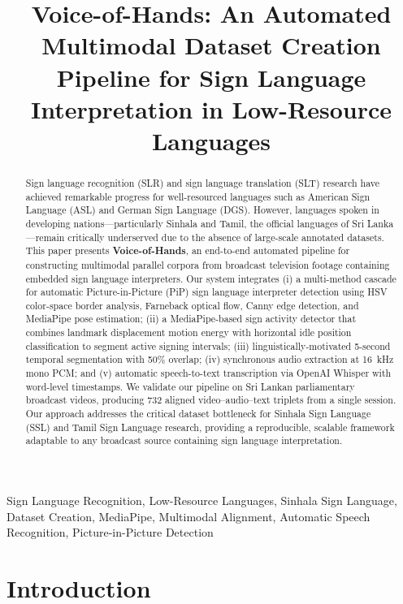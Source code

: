 \documentclass[journal]{IEEEtran}
\title{Voice-of-Hands: An Automated Multimodal Dataset Creation Pipeline for Sign Language Interpretation in Low-Resource Languages}
\author{
    \IEEEauthorblockN{Author Names\IEEEauthorrefmark{1}}
    \IEEEauthorblockA{\IEEEauthorrefmark{1}Department of Computer Science, University Name, Sri Lanka\\
    Email: corresponding.author@university.lk}
}
\begin{document}
\maketitle

\begin{abstract}
Sign language recognition (SLR) and sign language translation (SLT) research have achieved remarkable progress for well-resourced languages such as American Sign Language (ASL) and German Sign Language (DGS). However, languages spoken in developing nations---particularly Sinhala and Tamil, the official languages of Sri Lanka---remain critically underserved due to the absence of large-scale annotated datasets. This paper presents \textbf{Voice-of-Hands}, an end-to-end automated pipeline for constructing multimodal parallel corpora from broadcast television footage containing embedded sign language interpreters. Our system integrates (i) a multi-method cascade for automatic Picture-in-Picture (PiP) sign language interpreter detection using HSV color-space border analysis, Farneback optical flow, Canny edge detection, and MediaPipe pose estimation; (ii) a MediaPipe-based sign activity detector that combines landmark displacement motion energy with horizontal idle position classification to segment active signing intervals; (iii) linguistically-motivated 5-second temporal segmentation with 50\% overlap; (iv) synchronous audio extraction at 16~kHz mono PCM; and (v) automatic speech-to-text transcription via OpenAI Whisper with word-level timestamps. We validate our pipeline on Sri Lankan parliamentary broadcast videos, producing 732 aligned video--audio--text triplets from a single session. Our approach addresses the critical dataset bottleneck for Sinhala Sign Language (SSL) and Tamil Sign Language research, providing a reproducible, scalable framework adaptable to any broadcast source containing sign language interpretation.
\end{abstract}

\begin{IEEEkeywords}
Sign Language Recognition, Low-Resource Languages, Sinhala Sign Language, Dataset Creation, MediaPipe, Multimodal Alignment, Automatic Speech Recognition, Picture-in-Picture Detection
\end{IEEEkeywords}

\section{Introduction}
\label{sec:introduction}
\end{document}
